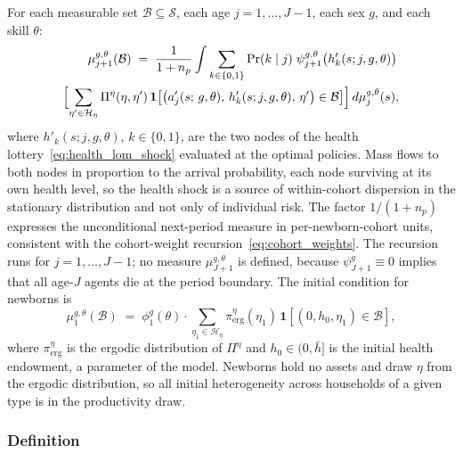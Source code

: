 \documentclass[12pt,a4paper]{article}
\begin{document}
For each measurable set $\mathcal{B} \subseteq \mathcal{S}$, each age $j = 1, \ldots, J-1$, each sex $g$, and each skill $\theta$:
\begin{equation}
\label{eq:lom}
\begin{split}
\mu_{j+1}^{g,\theta}(\mathcal{B})
\;=\;
\frac{1}{1 + n_p}
\int
\sum_{k \in \{0,1\}} \Pr(k \mid j)\;
\psi_{j+1}^{g,\theta}\bigl(h'_k(s; j, g, \theta)\bigr)\,\\
\Bigl[\sum_{\eta' \in \mathcal{H}_\eta}
\Pi^\eta(\eta, \eta')\,
\mathbf{1}\bigl[\bigl(a_j'(s;\, g, \theta),\, h'_k(s; j, g, \theta),\, \eta'\bigr) \in \mathcal{B}\bigr]
\Bigr]
\, d\mu_j^{g,\theta}(s),
\end{split}
\end{equation}
where $h'_k(s; j, g, \theta)$, $k \in \{0,1\}$, are the two nodes of the health lottery~\eqref{eq:health_lom_shock} evaluated at the optimal policies. Mass flows to both nodes in proportion to the arrival probability, each node surviving at its own health level, so the health shock is a source of within-cohort dispersion in the stationary distribution and not only of individual risk.
The factor $1/(1+n_p)$ expresses the unconditional next-period measure in per-newborn-cohort units, consistent with the cohort-weight recursion~\eqref{eq:cohort_weights}. The recursion runs for $j = 1, \ldots, J-1$; no measure $\mu^{g,\theta}_{J+1}$ is defined, because $\psi^{g}_{J+1} \equiv 0$ implies that all age-$J$ agents die at the period boundary. The initial condition for newborns is
\begin{equation}
\label{eq:initial_dist}
\mu_1^{g,\theta}(\mathcal{B})
\;=\;
\phi_{1}^{g}(\theta) \cdot
\sum_{\eta_1 \in \mathcal{H}_\eta} \pi^\eta_{\mathrm{erg}}(\eta_1)\,
\mathbf{1}[(0, h_0, \eta_1) \in \mathcal{B}],
\end{equation}
where $\pi^\eta_{\mathrm{erg}}$ is the ergodic distribution of $\Pi^\eta$ and $h_0 \in (0, \bar h]$ is the initial health endowment, a parameter of the model. Newborns hold no assets and draw $\eta$ from the ergodic distribution, so all initial heterogeneity across households of a given type is in the productivity draw.

\subsubsection{Definition}
\end{document}

